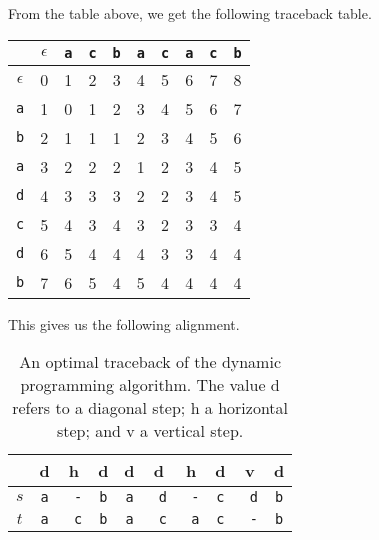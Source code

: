 \documentclass[a4paper, openany]{memoir}
\begin{document}
From the table above, we get the following traceback table.
\begin{table}[H]
    \centering
    \begin{tabular}{|c|c|c|c|c|c|c|c|c|c|}
        \hline
         & $\epsilon$ & \texttt{a} & \texttt{c} & \texttt{b} & \texttt{a} & \texttt{c} & \texttt{a} & \texttt{c} & \texttt{b} \\
        \hline
        $\epsilon$ & {\color{red} 0} & 1 & 2 & 3 & 4 & 5 & 6 & 7 & 8 \\
        \hline
        \texttt{a} & 1 & {\color{red} 0} & {\color{red} 1} & 2 & 3 & 4 & 5 & 6 & 7 \\
        \hline
        \texttt{b} & 2 & 1 & 1 & {\color{red} 1} & 2 & 3 & 4 & 5 & 6 \\
        \hline
        \texttt{a} & 3 & 2 & 2 & 2 & {\color{red} 1} & 2 & 3 & 4 & 5 \\
        \hline
        \texttt{d} & 4 & 3 & 3 & 3 & 2 & {\color{red} 2} & {\color{red} 3} & 4 & 5 \\
        \hline
        \texttt{c} & 5 & 4 & 3 & 4 & 3 & 2 & 3 & {\color{red} 3} & 4 \\
        \hline
        \texttt{d} & 6 & 5 & 4 & 4 & 4 & 3 & 3 & {\color{red} 4} & 4 \\
        \hline
        \texttt{b} & 7 & 6 & 5 & 4 & 5 & 4 & 4 & 4 & {\color{red} 4} \\
        \hline
    \end{tabular}
\end{table}
\noindent This gives us the following alignment.
\begin{table}[H]
    \centering
    \begin{tabular}{|c|ccccccccc|}
        \hline
        & d & h & d & d & d & h & d & v & d \\
        \hline
        $s$ & \texttt{a} & \texttt{\color{red} -} & \texttt{b} & \texttt{a} & \texttt{\color{red} d} & \texttt{\color{red} -} & \texttt{c} & \texttt{\color{red} d} & \texttt{b} \\
        $t$ & \texttt{a} & \texttt{\color{red} c} & \texttt{b} & \texttt{a} & \texttt{\color{red} c} & \texttt{\color{red} a} &\texttt{c} & \texttt{\color{red} -} & \texttt{b} \\
        \hline
    \end{tabular}
    \caption{An optimal traceback of the dynamic programming algorithm. The value d refers to a diagonal step; h a horizontal step; and v a vertical step.}
\end{table}
\end{document}

